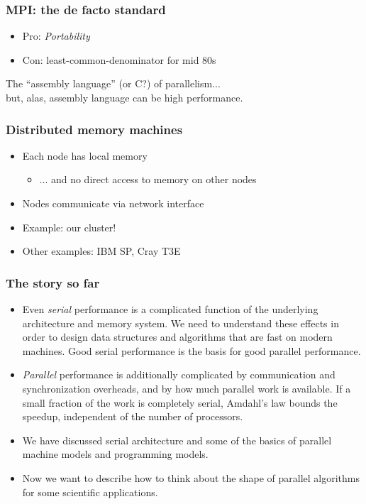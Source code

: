 \documentclass{beamer}
\begin{document}
\begin{frame}
  \frametitle{MPI: the de facto standard}

  \begin{itemize}
  \item Pro: {\em Portability}
  \item Con: least-common-denominator for mid 80s
  \end{itemize}
  The ``assembly language'' (or C?) of parallelism... \\
  \hspace{5mm} but, alas, assembly language can be high performance.

\end{frame}


\begin{frame}
  \frametitle{Distributed memory machines}
  
  \begin{itemize}
  \item Each node has local memory
    \begin{itemize}
    \item ... and no direct access to memory on other nodes
    \end{itemize}
  \item Nodes communicate via network interface
  \item Example: our cluster!
  \item Other examples: IBM SP, Cray T3E
  \end{itemize}
\end{frame}


\begin{frame}
  \frametitle{The story so far}

  \begin{itemize}
  \item Even {\em serial} performance is a complicated function of
        the underlying architecture and memory system.  We need to
        understand these effects in order to design data structures
        and algorithms that are fast on modern machines.  Good
        serial performance is the basis for good parallel performance.
  \item {\em Parallel} performance is additionally complicated by
        communication and synchronization overheads, and by how
        much parallel work is available.  If a small fraction of the
        work is completely serial, Amdahl's law bounds the speedup,
        independent of the number of processors.
  \item We have discussed serial architecture and some of the basics
        of parallel machine models and programming models.
  \item Now we want to describe how to think about the shape of
        parallel algorithms for some scientific applications.
  \end{itemize}
\end{frame}
\end{document}
